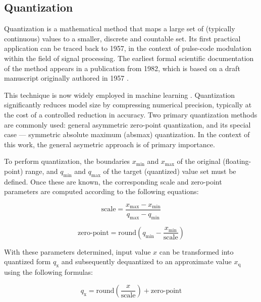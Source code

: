 {\subsection{Quantization}
\label{subsec:quantization}

Quantization is a mathematical method that maps a large set of (typically continuous) values to a smaller, discrete and countable set.
Its first practical application can be traced back to 1957, in the context of pulse-code modulation within the field of signal processing.
The earliest formal scientific documentation of the method appears in a publication from 1982,
which is based on a draft manuscript originally authored in 1957 \cite{firstQuantization}.

This technique is now widely employed in machine learning \cite{MLQuantization1, MLQuantization2}.
Quantization significantly reduces model size by compressing numerical precision, typically at the cost of a controlled reduction in accuracy.
Two primary quantization methods are commonly used: general asymmetric zero-point quantization, and its special case ---
symmetric absolute maximum (absmax) quantization.
In the context of this work, the general asymetric approach is of primary importance.

To perform quantization, the boundaries \( x_{\text{min}} \) and \( x_{\text{max}} \) of the original (floating-point) range,
and \( q_{\text{min}} \) and \( q_{\text{max}} \) of the target (quantized) value set must be defined.
Once these are known, the corresponding scale and zero-point parameters are computed according to the following equations:

\begin{equation}
\text{scale} = \frac{x_{\text{max}} - x_{\text{min}}}{q_{\text{max}} - q_{\text{min}}}
\label{eq:scale}
\end{equation}

\begin{equation}
\text{zero-point} = \text{round}\left( q_{\text{min}} - \frac{x_{\text{min}}}{\text{scale}} \right)
\label{eq:zeropoint}
\end{equation}

With these parameters determined,
input value \( x \) can be transformed into quantized form \( q_{\text{x}} \) and subsequently dequantized to an approximate value \( x_{\text{q}} \) using the following formulas:

\begin{equation}
q_{\text{x}} = \text{round}\left(\frac{x}{\text{scale}} \right) + \text{zero-point}
\label{eq:quantize}
\end{equation}

}
